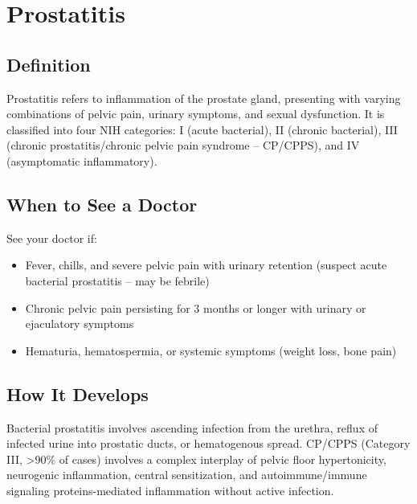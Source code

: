 \chapter{Prostatitis}

\section*{Definition}
Prostatitis refers to inflammation of the prostate gland, presenting with varying combinations of pelvic pain, urinary symptoms, and sexual dysfunction. It is classified into four NIH categories: I (acute bacterial), II (chronic bacterial), III (chronic prostatitis/chronic pelvic pain syndrome -- CP/CPPS), and IV (asymptomatic inflammatory).

\section*{When to See a Doctor}
See your doctor if:
\begin{itemize}
  \item Fever, chills, and severe pelvic pain with urinary retention (suspect acute bacterial prostatitis -- may be febrile)
  \item Chronic pelvic pain persisting for 3 months or longer with urinary or ejaculatory symptoms
  \item Hematuria, hematospermia, or systemic symptoms (weight loss, bone pain)
\end{itemize}

\section*{How It Develops}
Bacterial prostatitis involves ascending infection from the urethra, reflux of infected urine into prostatic ducts, or hematogenous spread. CP/CPPS (Category III, >90\% of cases) involves a complex interplay of pelvic floor hypertonicity, neurogenic inflammation, central sensitization, and autoimmune/immune signaling proteins-mediated inflammation without active infection.

